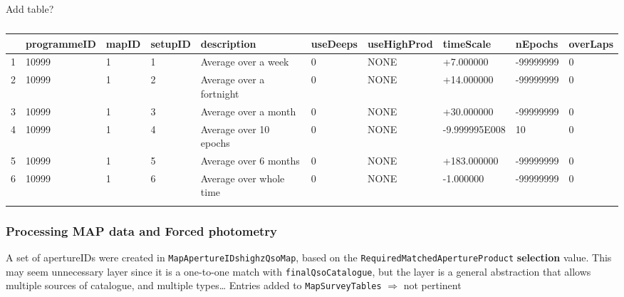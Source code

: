 \documentclass[usenatbib]{mnras}
\begin{document}
    Add table?
    \begin{table*}
      \begin{center}
        \setlength{\tabcolsep}{4pt}
        \begin{tabular}{lll lll lll l}
          \hline \hline
          &  programmeID &	mapID &	setupID  &	description               &	useDeeps  &	useHighProd &	timeScale	    &  nEpochs     &	overLaps\\
          \hline
          1	& 10999	           &    1       &	1            &      Average over a week	 &     0        & 	NONE            &	+7.000000  &	-99999999 &	0\\
          2	& 10999             & 	 1	  & 2   	     & Average over a fortnight &	0        &	NONE	&+14.000000	&-99999999 &	0\\
          3	& 10999	           &    1  	 & 3	             & Average over a month	&      0        &	NONE	&+30.000000	&-99999999 &	0\\
          4	& 10999             & 	 1	 & 4	              & Average over 10 epochs &	0        &	NONE	&-9.999995E008 &	10 &	0\\
          5	& 10999             &	 1	 & 5	             & Average over 6 months   &	0        &	NONE	&+183.000000 &	-99999999 &	0\\
          6	& 10999            &	 1	 & 6	           & Average over whole time  &	0        &	NONE	&-1.000000 &	-99999999 &	0\\
          \hline \hline
          \label{tab:The_Numbers}
        \end{tabular}
        \caption{}
      \end{center}
    \end{table*}
    
    
    \subsubsection{Processing MAP data and Forced photometry} 
    A set of apertureIDs were created in \verb+MapApertureIDshighzQsoMap+, based on
    the \verb+RequiredMatchedApertureProduct+ {\bf selection} value. This may
    seem unnecessary layer since it is a one-to-one match with \verb+finalQsoCatalogue+,
    but the layer is a general abstraction that allows multiple sources of
    catalogue, and multiple types\ldots
    Entries added to \verb+MapSurveyTables+ $\Rightarrow$ not pertinent
\end{document}
